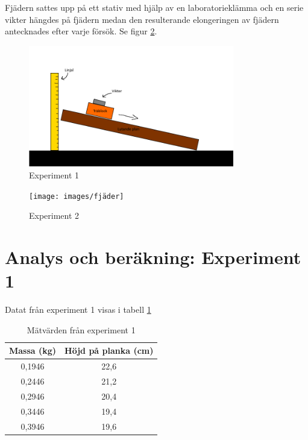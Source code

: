 \documentclass[11p, titlepage, oneside, a4paper]{article}
\begin{document}
Fjädern sattes upp på ett stativ med hjälp av en laboratorieklämma och en serie vikter hängdes på fjädern medan den resulterande elongeringen av fjädern antecknades efter varje försök. Se figur \ref{fig:fjäder}.
        

        
        \begin{figure}[!h]
            \includegraphics[width=0.8\textwidth]{images/lutandeplangrej}
            \caption{Experiment 1}
            \label{fig:lutandeplan}
        \end{figure}

        \begin{figure}[!h]
            \texttt{[image: images/fjäder]}
            \caption{Experiment 2}
            \label{fig:fjäder}
        \end{figure}

    \newpage
	\section{Analys och beräkning: Experiment 1}
        Datat från experiment 1 visas i tabell \ref{table:result}
        
        \begin{table}
            \begin{center}
            \begin{tabular}{ |c|c| } 
                \hline
                Massa (kg) & Höjd på planka (cm)  \\
                \hline
                0,1946 & 22,6 \\
                0,2446 & 21,2 \\
                0,2946 & 20,4 \\
                0,3446 & 19,4 \\
                0,3946 & 19,6 \\
                \hline
            \end{tabular}
                \caption{Mätvärden från experiment 1}
                \label{table:result}
            \end{center}
        \end{table}
\end{document}
